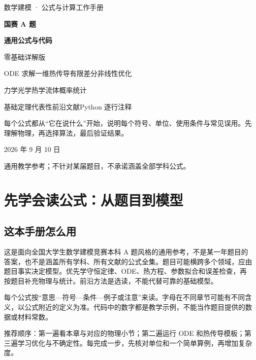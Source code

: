 \documentclass[UTF8,zihao=-4,openany,oneside,fontset=windows]{ctexbook}
\begin{document}
\begin{titlepage}
\centering
\vspace*{22mm}
{\large\color{inkblue} 数学建模 · 公式与计算工作手册\par}
\vspace{12mm}
{\Huge\bfseries 国赛 A 题\par}
\vspace{5mm}
{\Huge\bfseries 通用公式与代码\par}
\vspace{10mm}
{\LARGE 零基础详解版\par}
\vspace{16mm}
{\large ODE 求解\quad 一维热传导有限差分\quad 非线性优化\par}
\vspace{4mm}
{\large 力学\quad 光学\quad 热学\quad 流体\quad 概率统计\par}
\vspace{4mm}
{\large 基础定理\quad 代表性前沿文献\quad Python 逐行注释\par}
\vfill
\begin{minipage}{0.82\textwidth}
\large 每个公式都从“它在说什么”开始，说明每个符号、单位、使用条件与常见误用。先理解物理，再选择算法，最后验证结果。
\end{minipage}
\vfill
{\large 2026 年 9 月 10 日\par}
\vspace{5mm}
{\small 通用教学参考；不针对某届题目，不承诺涵盖全部学科公式。\par}
\end{titlepage}
\frontmatter
\tableofcontents
\mainmatter
\chapter{先学会读公式：从题目到模型}
\section{这本手册怎么用}
这是面向全国大学生数学建模竞赛本科 A 题风格的通用参考，不是某一年题目的答案，也不是涵盖所有学科、所有文献的公式全集。题目可能横跨多个领域，应由题目事实决定模型。优先学守恒定律、ODE、热方程、参数拟合和误差检查，再按题目补充物理与统计。前沿方法是选读，不能代替可靠的基础模型。

每个公式按“意思—符号—条件—例子或注意”来读。字母在不同章节可能有不同含义，以公式附近的定义为准。代码中的数字都是教学示例，不能当作题目提供的数据或材料常数。

推荐顺序：第一遍看本章与对应的物理小节；第二遍运行 ODE 和热传导模板；第三遍学习优化与不确定性。每完成一步，先核对单位和一个简单算例，再增加复杂度。
\end{document}
